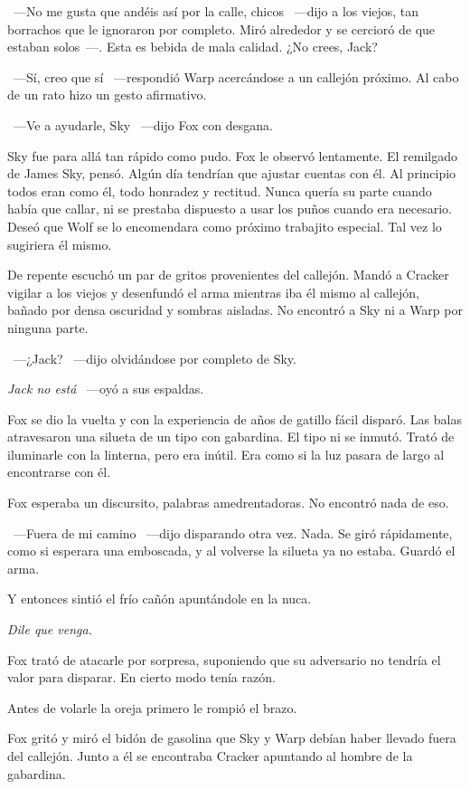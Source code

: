 ~---No me gusta que andéis así por la calle, chicos ~---dijo a los viejos, tan borrachos que le ignoraron por completo. Miró alrededor y se cercioró de que estaban solos~---. Esta es bebida de mala calidad. ¿No crees, Jack?

~---Sí, creo que sí ~---respondió Warp acercándose a un callejón próximo. Al cabo de un rato hizo un gesto afirmativo.

~---Ve a ayudarle, Sky ~---dijo Fox con desgana.

Sky fue para allá tan rápido como pudo. Fox le observó lentamente. El remilgado de James Sky, pensó. Algún día tendrían que ajustar cuentas con él. Al principio todos eran como él, todo honradez y rectitud. Nunca quería su parte cuando había que callar, ni se prestaba dispuesto a usar los puños cuando era necesario. Deseó que Wolf se lo encomendara como próximo trabajito especial. Tal vez lo sugiriera él mismo.

De repente escuchó un par de gritos provenientes del callejón. Mandó a Cracker vigilar a los viejos y desenfundó el arma mientras iba él mismo al callejón, bañado por densa oscuridad y sombras aisladas. No encontró a Sky ni a Warp por ninguna parte.

~---¿Jack? ~---dijo olvidándose por completo de Sky.

\emph{Jack no está} ~---oyó a sus espaldas.

Fox se dio la vuelta y con la experiencia de años de gatillo fácil disparó. Las balas atravesaron una silueta de un tipo con gabardina. El tipo ni se inmutó. Trató de iluminarle con la linterna, pero era inútil. Era como si la luz pasara de largo al encontrarse con él.

Fox esperaba un discursito, palabras amedrentadoras. No encontró nada de eso.

~---Fuera de mi camino ~---dijo disparando otra vez. Nada. Se giró rápidamente, como si esperara una emboscada, y al volverse la silueta ya no estaba. Guardó el arma.

Y entonces sintió el frío cañón apuntándole en la nuca.

\emph{Dile que venga.}

Fox trató de atacarle por sorpresa, suponiendo que su adversario no tendría el valor para disparar. En cierto modo tenía razón.

Antes de volarle la oreja primero le rompió el brazo.

Fox gritó y miró el bidón de gasolina que Sky y Warp debían haber llevado fuera del callejón. Junto a él se encontraba Cracker apuntando al hombre de la gabardina.

